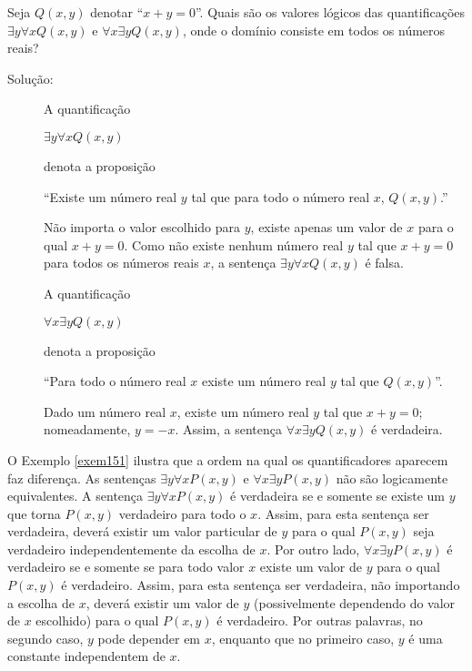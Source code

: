 \begin{exmp}
\label{exem151}
Seja $Q(x,y)$ denotar ``$x+y=0$''. Quais são os valores lógicos das
quantificações $\exists y\forall xQ(x,y)$ e $\forall x\exists yQ(x,y)$, onde o
domínio consiste em todos os números reais?
\begin{description}
\item[Solução:]A quantificação
\begin{center}
$\exists y\forall xQ(x,y)$
\end{center}
denota a proposição
\begin{center}
``Existe um número real $y$ tal que para todo o número real $x$, $Q(x,y)$.''
\end{center}

Não importa o valor escolhido para $y$, existe apenas um valor de $x$ para o
qual $x+y=0$. Como não existe nenhum número real $y$ tal que $x+y=0$ para todos
os números reais $x$, a sentença $\exists y\forall xQ(x,y)$ é falsa.

A quantificação
\begin{center}
$\forall x\exists yQ(x,y)$
\end{center}
denota a proposição
\begin{center}
``Para todo o número real $x$ existe um número real $y$ tal que $Q(x,y)$''.
\end{center}

Dado um número real $x$, existe um número real $y$ tal que $x+y=0$;
nomeadamente, $y=-x$. Assim, a sentença $\forall x\exists yQ(x,y)$ é verdadeira.
\end{description}
\end{exmp}

O Exemplo \ref{exem151} ilustra que a ordem na qual os quantificadores aparecem
faz diferença. As sentenças $\exists y\forall xP(x,y)$ e $\forall x\exists
yP(x,y)$ não são logicamente equivalentes. A sentença $\exists y\forall xP(x,y)$
é verdadeira se e somente se existe um $y$ que torna $P(x,y)$ verdadeiro para
todo o $x$. Assim, para esta sentença ser verdadeira, deverá existir um valor
particular de $y$ para o qual $P(x,y)$ seja verdadeiro independentemente da
escolha de $x$. Por outro lado, $\forall x\exists yP(x,y)$ é verdadeiro se e
somente se para todo valor $x$ existe um valor de $y$ para o qual $P(x,y)$ é
verdadeiro. Assim, para esta sentença ser verdadeira, não importando a escolha
de $x$, deverá existir um valor de $y$ (possivelmente dependendo do valor de $x$
escolhido) para o qual $P(x,y)$ é verdadeiro. Por outras palavras, no segundo
caso, $y$ pode depender em $x$, enquanto que no primeiro caso, $y$ é uma
constante independentem de $x$.

